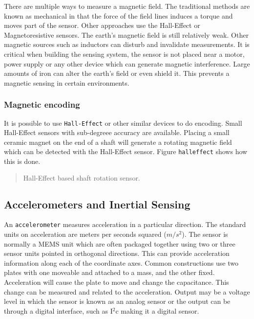 There are multiple ways to measure a magnetic field. The traditional
methods are known as mechanical in that the force of the field lines
induces a torque and moves part of the sensor. Other approaches use the
Hall-Effect or Magnetoresistive sensors. The earth's magnetic field is
still relatively weak. Other magnetic sources such as inductors can
disturb and invalidate measurements. It is critical when building the
sensing system, the sensor is not placed near a motor, power supply or
any other device which can generate magnetic interference. Large amounts
of iron can alter the earth's field or even shield it. This prevents a
magnetic sensing in certain environments.

\hypertarget{magnetic-encoding}{%
\subsubsection{Magnetic encoding}\label{magnetic-encoding}}

It is possible to use \texttt{Hall-Effect} or other similar devices to
do encoding. Small Hall-Effect sensors with sub-degreee accuracy are
available. Placing a small ceramic magnet on the end of a shaft will
generate a rotating magnetic field which can be detected with the
Hall-Effect sensor. Figure \texttt{halleffect} shows how this is done.

\begin{quote}
Hall-Effect based shaft rotation sensor.
\end{quote}

\hypertarget{accelerometers-and-inertial-sensing}{%
\subsection{Accelerometers and Inertial
Sensing}\label{accelerometers-and-inertial-sensing}}

An \texttt{accelerometer} measures acceleration in a particular
direction. The standard units on acceleration are meters per seconds
squared (\(m/s^2\)). The sensor is normally a MEMS unit which are often
packaged together using two or three sensor units pointed in orthogonal
directions. This can provide acceleration information along each of the
coordinate axes. Common constructions use two plates with one moveable
and attached to a mass, and the other fixed. Acceleration will cause the
plate to move and change the capacitance. This change can be measured
and related to the acceleration. Output may be a voltage level in which
the sensor is known as an analog sensor or the output can be through a
digital interface, such as I\(^2\)c making it a digital sensor.

